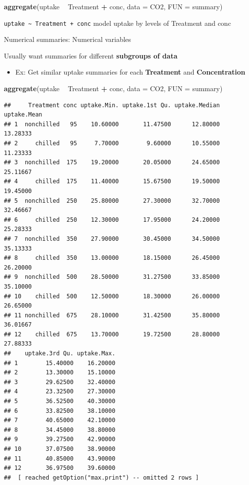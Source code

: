 \documentclass[
]{book}
\newenvironment{Shaded}{\begin{snugshade}}{\end{snugshade}}
\newcommand{\DataTypeTok}[1]{\textcolor[rgb]{0.13,0.29,0.53}{#1}}
\newcommand{\KeywordTok}[1]{\textcolor[rgb]{0.13,0.29,0.53}{\textbf{#1}}}
\newcommand{\NormalTok}[1]{#1}
\newcommand{\OperatorTok}[1]{\textcolor[rgb]{0.81,0.36,0.00}{\textbf{#1}}}
\newcommand{\StringTok}[1]{\textcolor[rgb]{0.31,0.60,0.02}{#1}}
\providecommand{\tightlist}{%
  \setlength{\itemsep}{0pt}\setlength{\parskip}{0pt}}
\theoremstyle{definition}
\theoremstyle{definition}
\theoremstyle{definition}
\theoremstyle{remark}
\begin{document}
\begin{Shaded}
\begin{Highlighting}[]
\KeywordTok{aggregate}\NormalTok{(uptake }\OperatorTok{~}\StringTok{ }\NormalTok{Treatment }\OperatorTok{+}\StringTok{ }\NormalTok{conc, }\DataTypeTok{data =}\NormalTok{ CO2, }\DataTypeTok{FUN =}\NormalTok{ summary)}
\end{Highlighting}
\end{Shaded}

\texttt{uptake\ \textasciitilde{}\ Treatment\ +\ conc} model uptake by levels of Treatment and conc

Numerical summaries: Numerical variables

Usually want summaries for different \textbf{subgroups of data}

\begin{itemize}
\tightlist
\item
  Ex: Get similar uptake summaries for each \textbf{Treatment} and \textbf{Concentration}
\end{itemize}

\begin{Shaded}
\begin{Highlighting}[]
\KeywordTok{aggregate}\NormalTok{(uptake }\OperatorTok{~}\StringTok{ }\NormalTok{Treatment }\OperatorTok{+}\StringTok{ }\NormalTok{conc, }\DataTypeTok{data =}\NormalTok{ CO2, }\DataTypeTok{FUN =}\NormalTok{ summary)}
\end{Highlighting}
\end{Shaded}

\begin{verbatim}
##     Treatment conc uptake.Min. uptake.1st Qu. uptake.Median uptake.Mean
## 1  nonchilled   95    10.60000       11.47500      12.80000    13.28333
## 2     chilled   95     7.70000        9.60000      10.55000    11.23333
## 3  nonchilled  175    19.20000       20.05000      24.65000    25.11667
## 4     chilled  175    11.40000       15.67500      19.50000    19.45000
## 5  nonchilled  250    25.80000       27.30000      32.70000    32.46667
## 6     chilled  250    12.30000       17.95000      24.20000    25.28333
## 7  nonchilled  350    27.90000       30.45000      34.50000    35.13333
## 8     chilled  350    13.00000       18.15000      26.45000    26.20000
## 9  nonchilled  500    28.50000       31.27500      33.85000    35.10000
## 10    chilled  500    12.50000       18.30000      26.00000    26.65000
## 11 nonchilled  675    28.10000       31.42500      35.80000    36.01667
## 12    chilled  675    13.70000       19.72500      28.80000    27.88333
##    uptake.3rd Qu. uptake.Max.
## 1        15.40000    16.20000
## 2        13.30000    15.10000
## 3        29.62500    32.40000
## 4        23.32500    27.30000
## 5        36.52500    40.30000
## 6        33.82500    38.10000
## 7        40.65000    42.10000
## 8        34.45000    38.80000
## 9        39.27500    42.90000
## 10       37.07500    38.90000
## 11       40.85000    43.90000
## 12       36.97500    39.60000
##  [ reached getOption("max.print") -- omitted 2 rows ]
\end{verbatim}
\end{document}
